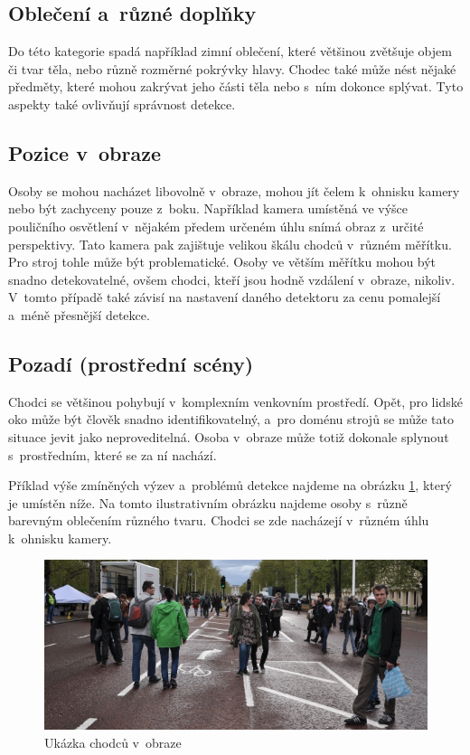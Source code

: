 \subsection{Oblečení a~různé doplňky}
Do této kategorie spadá například zimní oblečení, které většinou zvětšuje objem či tvar těla, nebo různě rozměrné pokrývky hlavy. Chodec také může nést nějaké předměty, které mohou zakrývat jeho části těla nebo s~ním dokonce splývat. Tyto aspekty také ovlivňují správnost detekce.

\subsection{Pozice v~obraze}
Osoby se mohou nacházet libovolně v~obraze, mohou jít čelem k~ohnisku kamery nebo být zachyceny pouze z~boku. Například kamera umístěná ve výšce pouličního osvětlení v~nějakém předem určeném úhlu snímá obraz z~určité perspektivy. Tato kamera pak zajištuje velikou škálu chodců v~různém měřítku. Pro stroj tohle může být problematické. Osoby ve větším měřítku mohou být snadno detekovatelné, ovšem chodci, kteří jsou hodně vzdálení v~obraze, nikoliv. V~tomto případě také závisí na nastavení daného detektoru za cenu pomalejší a~méně přesnější detekce. 

\subsection{Pozadí (prostřední scény)}
Chodci se většinou pohybují v~komplexním venkovním prostředí. Opět, pro lidské oko může být člověk snadno identifikovatelný, a~pro doménu strojů se může tato situace jevit jako neproveditelná. Osoba v~obraze může totiž dokonale splynout s~prostředním, které se za ní nachází.  

Příklad výše zmíněných výzev a~problémů detekce najdeme na obrázku \ref{pedestrians}, který je umístěn níže. Na tomto ilustrativním obrázku najdeme osoby s~různě barevným oblečením různého tvaru. Chodci se zde nacházejí v~různém úhlu k~ohnisku kamery. 

\begin{figure}[H]
\centering
\includegraphics[width=15cm]{figures/pedestrians}
\caption{Ukázka chodců v~obraze}
\label{pedestrians}
\end{figure}